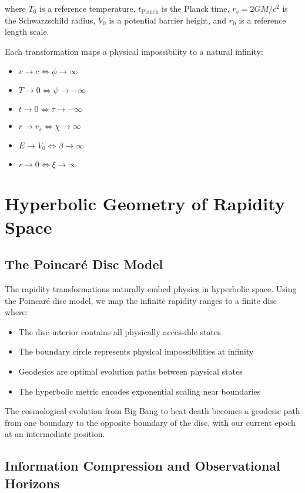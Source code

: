\documentclass[12pt,a4paper]{article}
\begin{document}
where $T_0$ is a reference temperature, $t_{\text{Planck}}$ is the Planck time, 
$r_s = 2GM/c^2$ is the Schwarzschild radius, $V_0$ is a potential barrier height, 
and $r_0$ is a reference length scale.

Each transformation maps a physical impossibility to a natural infinity:
\begin{itemize}
    \item $v \to c      \Leftrightarrow \phi    \to \infty$
    \item $T \to 0      \Leftrightarrow \psi    \to -\infty$
    \item $t \to 0      \Leftrightarrow \tau    \to -\infty$
    \item $r \to r_s    \Leftrightarrow \chi    \to \infty$
    \item $E \to V_0    \Leftrightarrow \beta   \to \infty$
    \item $r \to 0      \Leftrightarrow \xi     \to \infty$
\end{itemize}

\section{Hyperbolic Geometry of Rapidity Space}

\subsection{The Poincar\'e Disc Model}

The rapidity transformations naturally embed physics in hyperbolic space. Using 
the Poincar\'e disc model, we map the infinite rapidity ranges to a finite disc 
where:
\begin{itemize}
    \item The disc interior contains all physically accessible states
    \item The boundary circle represents physical impossibilities at infinity
    \item Geodesics are optimal evolution paths between physical states
    \item The hyperbolic metric encodes exponential scaling near boundaries
\end{itemize}

The cosmological evolution from Big Bang to heat death becomes a geodesic path 
from one boundary to the opposite boundary of the disc, with our current epoch 
at an intermediate position.

\subsection{Information Compression and Observational Horizons}
\end{document}
